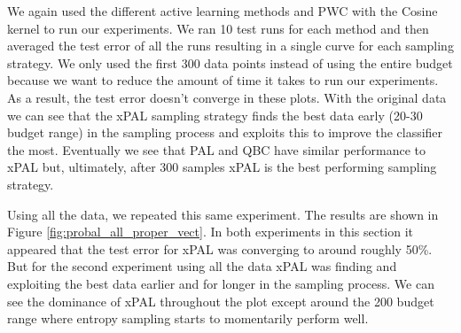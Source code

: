 We again used the different active learning methods and PWC with the Cosine kernel to run our experiments. We ran 10 test runs for each method and then averaged the test error of all the runs resulting in a single curve for each sampling strategy. We only used the first 300 data points instead of using the entire budget because we want to reduce the amount of time it takes to run our experiments. As a result, the test error doesn't converge in these plots. With the original data we can see that the xPAL sampling strategy finds the best data early (20-30 budget range) in the sampling process and exploits this to improve the classifier the most. Eventually we see that PAL and QBC have similar performance to xPAL but, ultimately, after 300 samples xPAL is the best performing sampling strategy.

Using all the data, we repeated this same experiment. The results are shown in Figure \ref{fig:probal_all_proper_vect}. In both experiments in this section it appeared that the test error for xPAL was converging to around roughly 50\%. But for the second experiment using all the data xPAL was finding and exploiting the best data earlier and for longer in the sampling process. We can see the dominance of xPAL throughout the plot except around the 200 budget range where entropy sampling starts to momentarily perform well.

